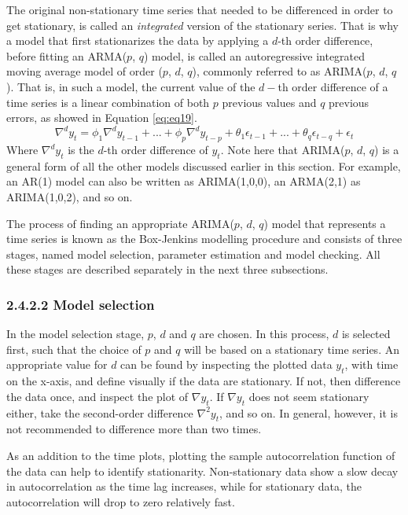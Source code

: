 \documentclass[12pt,oneside]{reedthesis}
\begin{document}
The original non-stationary time series that needed to be differenced in
order to get stationary, is called an \emph{integrated} version of the
stationary series. That is why a model that first stationarizes the data
by applying a \(d\)-th order difference, before fitting an ARMA(\(p\),
\(q\)) model, is called an autoregressive integrated moving average
model of order (\(p\), \(d\), \(q\)), commonly referred to as
ARIMA(\(p\), \(d\), \(q\)). That is, in such a model, the current value
of the \(d-\)th order difference of a time series is a linear
combination of both \(p\) previous values and \(q\) previous errors, as
showed in Equation \eqref{eq:eq19}.
\begin{equation} 
\nabla^{d}y_{t} = \phi_{1}\nabla^{d}y_{t-1} + ... + \phi_{p}\nabla^{d}y_{t-p} + \theta_{1}\epsilon_{t-1} + ... + \theta_{q}\epsilon_{t-q} + \epsilon_{t} 
\label{eq:eq19}
\end{equation}
Where \(\nabla^{d}y_{t}\) is the \(d\)-th order difference of \(y_{t}\).
Note here that ARIMA(\(p\), \(d\), \(q\)) is a general form of all the
other models discussed earlier in this section. For example, an AR(1)
model can also be written as ARIMA(1,0,0), an ARMA(2,1) as ARIMA(1,0,2),
and so on.

The process of finding an appropriate ARIMA(\(p\), \(d\), \(q\)) model
that represents a time series is known as the Box-Jenkins modelling
procedure and consists of three stages, named model selection, parameter
estimation and model checking. All these stages are described separately
in the next three subsections.

\subsubsection{2.4.2.2 Model selection}\label{twofourtwotwo}

In the model selection stage, \(p\), \(d\) and \(q\) are chosen. In this
process, \(d\) is selected first, such that the choice of \(p\) and
\(q\) will be based on a stationary time series. An appropriate value
for \(d\) can be found by inspecting the plotted data \(y_{t}\), with
time on the x-axis, and define visually if the data are stationary. If
not, then difference the data once, and inspect the plot of
\(\nabla y_{t}\). If \(\nabla y_{t}\) does not seem stationary either,
take the second-order difference \(\nabla^{2} y_{t}\), and so on. In
general, however, it is not recommended to difference more than two
times.

As an addition to the time plots, plotting the sample autocorrelation
function of the data can help to identify stationarity. Non-stationary
data show a slow decay in autocorrelation as the time lag increases,
while for stationary data, the autocorrelation will drop to zero
relatively fast.
\end{document}
